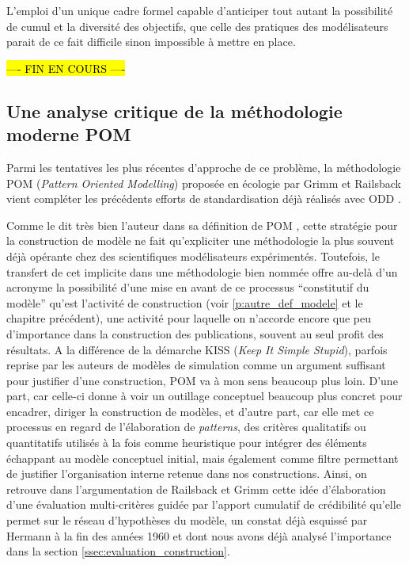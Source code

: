 L'emploi d'un unique cadre formel capable d'anticiper tout autant la possibilité de cumul et la diversité des objectifs, que celle des pratiques des modélisateurs parait de ce fait difficile sinon impossible à mettre en place.

\hl{ ---- FIN EN COURS ---- }

\subsection{Une analyse critique de la méthodologie moderne POM}


Parmi les tentatives les plus récentes d'approche de ce problème, la méthodologie POM (\textit{Pattern Oriented Modelling}) \autocites{Grimm2005,Grimm2011} proposée en écologie par Grimm et Railsback vient compléter les précédents efforts de standardisation déjà réalisés avec ODD \autocite{Grimm2010}. 

Comme le dit très bien l'auteur dans sa définition de POM , cette stratégie pour la construction de modèle ne fait qu'expliciter une méthodologie la plus souvent déjà opérante chez des scientifiques modélisateurs expérimentés. Toutefois, le transfert de cet implicite dans une méthodologie bien nommée offre au-delà d'un acronyme la possibilité d'une mise en avant de ce processus \enquote{constitutif du modèle} qu'est l'activité de construction (voir \ref{p:autre_def_modele} et le chapitre précédent), une activité pour laquelle on n'accorde encore que peu d'importance dans la construction des publications, souvent au seul profit des résultats. A la différence de la démarche KISS (\textit{Keep It Simple Stupid}), parfois reprise par les auteurs de modèles de simulation comme un argument suffisant pour justifier d'une construction, POM va à mon sens beaucoup plus loin. D'une part, car celle-ci donne à voir un outillage conceptuel beaucoup plus concret pour encadrer, diriger la construction de modèles, et d'autre part, car elle met ce processus en regard de l'élaboration de \textit{patterns}, des critères qualitatifs ou quantitatifs utilisés à la fois comme heuristique pour intégrer des éléments échappant au modèle conceptuel initial, mais également comme filtre permettant de justifier l'organisation interne retenue dans nos constructions. Ainsi, on retrouve dans l'argumentation de Railsback et Grimm cette idée d'élaboration d'une évaluation multi-critères guidée par l'apport cumulatif de crédibilité qu'elle permet sur le réseau d'hypothèses du modèle, un constat déjà esquissé par Hermann à la fin des années 1960 et dont nous avons déjà analysé l'importance dans la section \ref{ssec:evaluation_construction}. 

